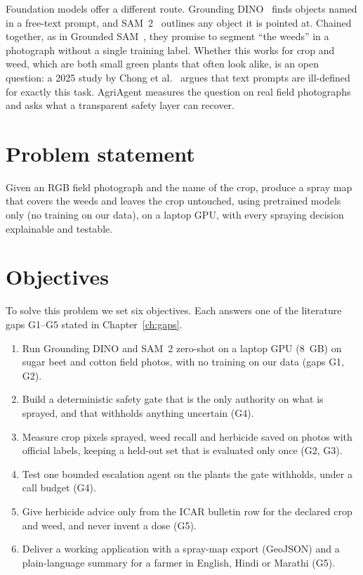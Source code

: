 Foundation models offer a different route. Grounding DINO~\cite{liu2024groundingdino} finds objects
named in a free-text prompt, and SAM~2~\cite{ravi2025sam2} outlines any object it is pointed at.
Chained together, as in Grounded SAM~\cite{ren2024groundedsam}, they promise to segment ``the weeds''
in a photograph without a single training label. Whether this works for crop and weed, which are both
small green plants that often look alike, is an open question: a 2025 study by Chong et
al.~\cite{chong2025zeroshot} argues that text prompts are ill-defined for exactly this task. AgriAgent
measures the question on real field photographs and asks what a transparent safety layer can recover.

\section{Problem statement}\label{sec:problem}
Given an RGB field photograph and the name of the crop, produce a spray map that covers the weeds and
leaves the crop untouched, using pretrained models only (no training on our data), on a laptop GPU,
with every spraying decision explainable and testable.

\section{Objectives}\label{sec:objectives}
To solve this problem we set six objectives. Each answers one of the literature gaps G1--G5 stated in
Chapter~\ref{ch:gaps}.
\begin{enumerate}[label=\textbf{O\arabic*.}]
\item Run Grounding DINO and SAM~2 zero-shot on a laptop GPU (8~GB) on sugar beet and cotton field
  photos, with no training on our data (gaps G1, G2).
\item Build a deterministic safety gate that is the only authority on what is sprayed, and that
  withholds anything uncertain (G4).
\item Measure crop pixels sprayed, weed recall and herbicide saved on photos with official labels,
  keeping a held-out set that is evaluated only once (G2, G3).
\item Test one bounded escalation agent on the plants the gate withholds, under a call budget (G4).
\item Give herbicide advice only from the ICAR bulletin row for the declared crop and weed, and never
  invent a dose (G5).
\item Deliver a working application with a spray-map export (GeoJSON) and a plain-language summary
  for a farmer in English, Hindi or Marathi (G5).
\end{enumerate}

